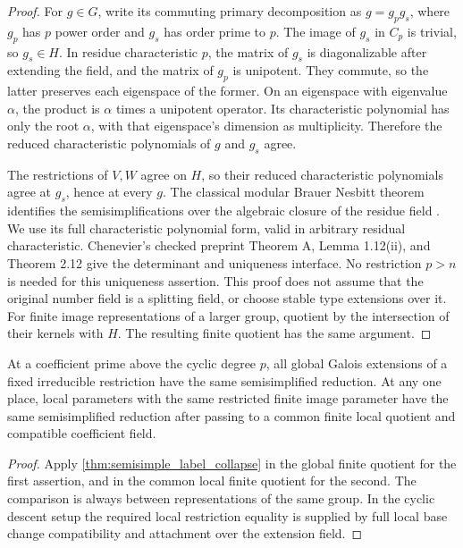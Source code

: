 \begin{proof}
For \(g\in G\), write its commuting primary decomposition as \(g=g_p g_s\), where \(g_p\) has \(p\) power order and \(g_s\) has order prime to \(p\). The image of \(g_s\) in \(C_p\) is trivial, so \(g_s\in H\). In residue characteristic \(p\), the matrix of \(g_s\) is diagonalizable after extending the field, and the matrix of \(g_p\) is unipotent. They commute, so the latter preserves each eigenspace of the former. On an eigenspace with eigenvalue \(\alpha\), the product is \(\alpha\) times a unipotent operator. Its characteristic polynomial has only the root \(\alpha\), with that eigenspace's dimension as multiplicity. Therefore the reduced characteristic polynomials of \(g\) and \(g_s\) agree.

The restrictions of \(V,W\) agree on \(H\), so their reduced characteristic polynomials agree at \(g_s\), hence at every \(g\). The classical modular Brauer Nesbitt theorem identifies the semisimplifications over the algebraic closure of the residue field \cite{BrauerNesbitt1941,Chenevier2014}. We use its full characteristic polynomial form, valid in arbitrary residual characteristic. Chenevier's checked preprint Theorem A, Lemma 1.12(ii), and Theorem 2.12 give the determinant and uniqueness interface. No restriction \(p>n\) is needed for this uniqueness assertion. This proof does not assume that the original number field is a splitting field, or choose stable type extensions over it. For finite image representations of a larger group, quotient by the intersection of their kernels with \(H\). The resulting finite quotient has the same argument.
\end{proof}

\begin{corollary}\label{cor:two_torsor_residual_collapse}
At a coefficient prime above the cyclic degree \(p\), all global Galois extensions of a fixed irreducible restriction have the same semisimplified reduction. At any one place, local parameters with the same restricted finite image parameter have the same semisimplified reduction after passing to a common finite local quotient and compatible coefficient field.
\end{corollary}

\begin{proof}
Apply \cref{thm:semisimple_label_collapse} in the global finite quotient for the first assertion, and in the common local finite quotient for the second. The comparison is always between representations of the same group. In the cyclic descent setup the required local restriction equality is supplied by full local base change compatibility and attachment over the extension field.
\end{proof}

